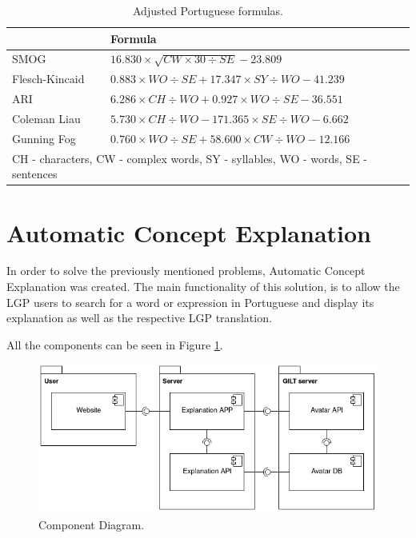 \documentclass[runningheads]{llncs}
\begin{document}
\begin{table}
    \caption{Adjusted Portuguese formulas.}
    \label{table:ptformulas}
    \begin{tabular}{l|l}
        \hline
        {} & {\bfseries Formula} \\
        \hline
        SMOG & \(16.830 \times \sqrt{CW \times 30 \div SE} - 23.809\)  \\
        \hline
        Flesch-Kincaid & \(0.883 \times WO \div SE + 17.347 \times SY \div WO - 41.239\) \\
        \hline
        ARI & \(6.286 \times CH \div WO + 0.927 \times WO \div SE - 36.551\) \\
        \hline
        Coleman Liau & \(5.730 \times CH \div WO - 171.365 \times SE \div WO - 6.662\) \\
        \hline
        Gunning Fog & \(0.760 \times WO \div SE + 58.600 \times CW \div WO - 12.166\) \\
        \hline
        \multicolumn{2}{l}{CH - characters, CW - complex words, SY - syllables, WO - words, SE - sentences}
    \end{tabular}
\end{table}

\section{Automatic Concept Explanation}

In order to solve the previously mentioned problems, Automatic Concept Explanation was created.
The main functionality of this solution, is to allow the LGP users to search for a word or expression in Portuguese and display its explanation as well as the respective LGP translation.

All the components can be seen in Figure \ref{fig1}.

\begin{figure}[ht]
\centering
\includegraphics[scale=0.4]{final_component_diagram.png}
\caption{Component Diagram.} \label{fig1}
\end{figure}
\end{document}
